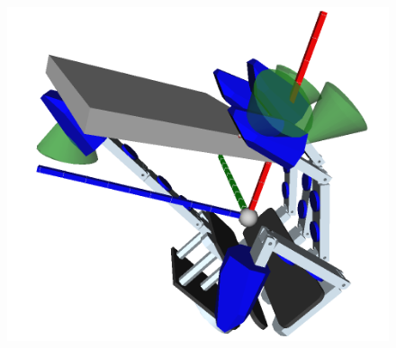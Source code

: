 \begin{figure}[H]
	\centering
	\begin{minipage} {.45\linewidth}
	  \includegraphics[width=\linewidth]{ContactPointsBox}
	\end{minipage}
\end{figure}	

\par
